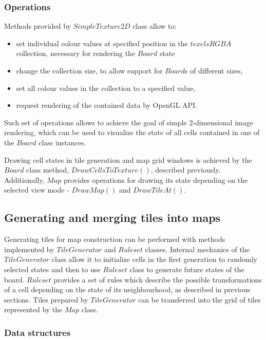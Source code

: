 \documentclass[12pt]{report}
\begin{document}
\subsubsection{Operations}

Methods provided by $SimpleTexture2D$ class allow to:

\begin{itemize}
	\item set individual colour values at specified position in the $texelsRGBA$ collection, necessary for rendering the $Board$ state
	\item change the collection size, to allow support for $Board$s of different sizes,
	\item set all colour values in the collection to a specified value,
	\item request rendering of the contained data by OpenGL API.
\end{itemize}  

Such set of operations allows to achieve the goal of simple 2-dimensional image rendering, which can be used to visualize the state of all cells contained in one of the $Board$ class instances.

Drawing cell states in tile generation and map grid windows is achieved by the $Board$ class method, $DrawCellsToTexture()$, described previously. Additionally, $Map$ provides operations for drawing its state depending on the selected view mode - $DrawMap()$ and $DrawTileAt()$.

\subsection{Generating and merging tiles into maps}

Generating tiles for map construction can be performed with methods implemented by $TileGenerator$ and $Ruleset$ classes. Internal mechanics of the $TileGenerator$ class allow it to initialize cells in the first generation to randomly selected states and then to use $Ruleset$ class to generate future states of the board. $Ruleset$ provides a set of rules which describe the possible transformations of a cell depending on the state of its neighbourhood, as described in previous sections. Tiles prepared by $TileGenerator$ can be transferred into the grid of tiles represented by the $Map$ class.

\subsubsection{Data structures} 
 
\end{document}

